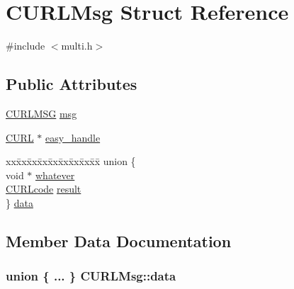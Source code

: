 \hypertarget{struct_c_u_r_l_msg}{}\section{C\+U\+R\+L\+Msg Struct Reference}
\label{struct_c_u_r_l_msg}


{\ttfamily \#include $<$multi.\+h$>$}

\subsection*{Public Attributes}
\begin{DoxyCompactItemize}
\item 
\hyperlink{multi_8h_a7f87d375fc82f79b121ef4adaeedc154}{C\+U\+R\+L\+M\+S\+G} \hyperlink{struct_c_u_r_l_msg_a805019ce36cd301163b184308220c601}{msg}
\item 
\hyperlink{curl_8h_ace655e3633b6533591283994d6b5cdda}{C\+U\+R\+L} $\ast$ \hyperlink{struct_c_u_r_l_msg_a236add50fa3dc85360e4aa7a85a9dfd1}{easy\+\_\+handle}
\item 
\begin{tabbing}
xx\=xx\=xx\=xx\=xx\=xx\=xx\=xx\=xx\=\kill
union \{\\
\>void $\ast$ \hyperlink{struct_c_u_r_l_msg_ae493c9ae3084340faf1aaa50ebf4b105}{whatever}\\
\>\hyperlink{curl_8h_af0691941698240652e0a391394217951}{CURLcode} \hyperlink{struct_c_u_r_l_msg_ac00f26a84ebe0c2c5cb420a47d15ffec}{result}\\
\} \hyperlink{struct_c_u_r_l_msg_ab2fe5a00eb1d1c3c2bd35e709b15dd92}{data}\\

\end{tabbing}\end{DoxyCompactItemize}


\subsection{Member Data Documentation}
\hypertarget{struct_c_u_r_l_msg_ab2fe5a00eb1d1c3c2bd35e709b15dd92}{}
\subsubsection[{data}]{\setlength{\rightskip}{0pt plus 5cm}union \{ ... \}   C\+U\+R\+L\+Msg\+::data}\label{struct_c_u_r_l_msg_ab2fe5a00eb1d1c3c2bd35e709b15dd92}
\hypertarget{struct_c_u_r_l_msg_a236add50fa3dc85360e4aa7a85a9dfd1}{}
